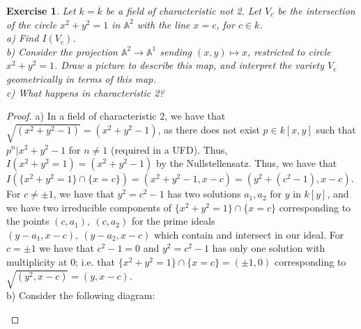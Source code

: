 \documentclass{article}
\newcommand{\bb}[1]{\mathbb{#1}}
\newtheorem{exercise}{Exercise}
\begin{document}
\begin{exercise}
  Let $k = \overline{k}$ be a field of characteristic not 2. Let $V_{c}$ be the intersection of the circle $x^{2}+y^{2} = 1$ in $\bb{A}^{2}$ with the line $x=c$, for $c \in k$. \\
  a) Find $I(V_{c})$. \\
  b) Consider the projection $\bb{A}^{2} \to \bb{A}^{1}$ sending $(x,y) \mapsto x$, restricted to circle $x^{2} + y^{2} =1$. Draw a picture to describe this map, and interpret the variety $V_{c}$ geometrically in terms of this map. \\
  c) What happens in characteristic 2?
\end{exercise}
\begin{proof}
  a) In a field of characteristic $2$, we have that $\sqrt{(x^{2}+y^{2}-1)} = (x^{2}+y^{2}-1)$, as there does not exist $p \in k[x,y]$ such that $p^{n} | x^{2}+y^{2}-1$ for $n \neq 1$ (required in a UFD). Thus, $I(x^{2}+y^{2} = 1) = (x^{2}+y^{2}-1)$ by the Nullstellensatz. Thus, we have that $I(\{x^{2}+y^{2} = 1\} \cap \{x=c\}) = (x^{2}+y^{2} -1, x-c) = (y^{2}+(c^{2}-1), x-c)$. For $c \neq \pm 1$, we have that $y^{2} = c^{2}-1$ has two solutions $a_{1}, a_{2}$ for $y$ in $k[y]$, and we have two irreducible components of $\{x^{2}+y^{2} = 1\} \cap \{x=c\}$ corresponding to the points $(c, a_{1}), \ (c,a_{2})$ for the prime ideals $(y-a_{1}, x-c), \ (y-a_{2}, x-c)$ which contain and intersect in our ideal. For $c = \pm 1$ we have that $c^{2} - 1 = 0$ and $y^{2} = c^{2} - 1$ has only one solution with multiplicity at $0$; i.e. that $\{x^{2}+y^{2} = 1\} \cap \{x=c\} = (\pm 1, 0)$ corresponding to $\sqrt{(y^{2}, x-c)} = (y, x-c)$. \\
  
  b) Consider the following diagram:

    \begin{center}


\begin{tikzpicture}[x=0.75pt,y=0.75pt,yscale=-1,xscale=1]


\end{tikzpicture}
\end{center}
\end{proof}
\end{document}
